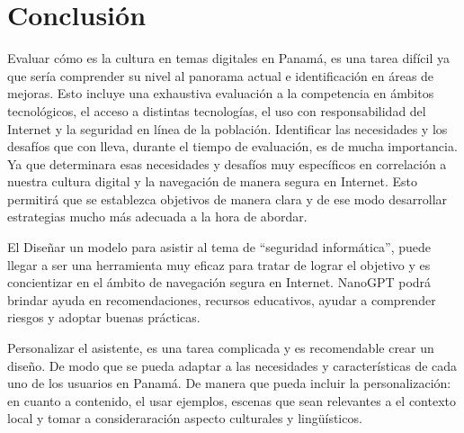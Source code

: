 

\section{Conclusión}\label{seccion:conclusion}

Evaluar cómo es la cultura en temas digitales en Panamá, es una tarea difícil ya que sería comprender su nivel al panorama actual e identificación en áreas de mejoras. Esto incluye una exhaustiva evaluación a la competencia en ámbitos tecnológicos, el acceso a distintas tecnologías, el uso con responsabilidad del Internet y la seguridad en línea de la población. 
Identificar las necesidades y los desafíos que con lleva, durante el tiempo de evaluación, es de mucha importancia. Ya que determinara esas necesidades y desafíos muy específicos en correlación a nuestra cultura digital y la navegación de manera segura en Internet. Esto permitirá que se establezca objetivos de manera clara y de ese modo desarrollar estrategias mucho más adecuada a la hora de abordar.

El Diseñar un modelo para asistir al tema de “seguridad informática”, puede llegar a ser una herramienta muy eficaz para tratar de lograr el objetivo y es concientizar en el ámbito de navegación segura en Internet. NanoGPT podrá brindar ayuda en recomendaciones, recursos educativos, ayudar a comprender riesgos y adoptar buenas prácticas.

Personalizar el asistente, es una tarea complicada y es recomendable crear un diseño. De modo que se pueda adaptar a las necesidades y características de cada uno de los usuarios en Panamá. De manera que pueda incluir la personalización: en cuanto a contenido, el usar ejemplos, escenas que sean relevantes a el contexto local y tomar a consideraración aspecto culturales y lingüísticos.
